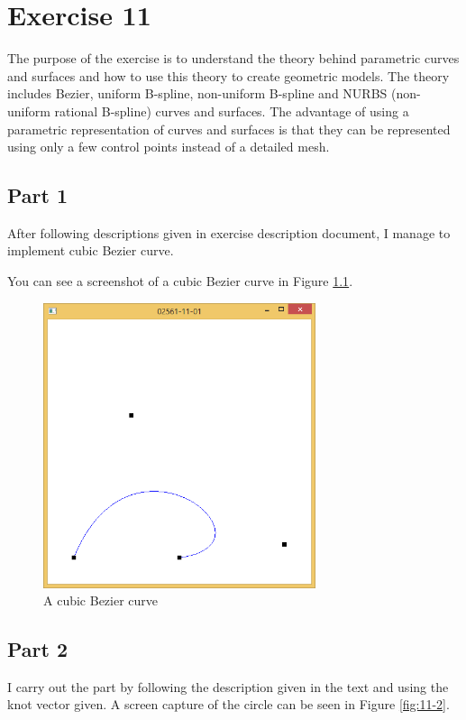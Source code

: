 
\chapter{Exercise 11}
\label{cha:ugeopgave-11}

The purpose of the exercise is to understand the theory behind parametric curves and surfaces and how to use this theory to create geometric models. The theory includes Bezier, uniform B-spline, non-uniform B-spline and NURBS (non-uniform rational B-spline) curves and surfaces.
The advantage of using a parametric representation of curves and surfaces is that they can be represented using only a few control points instead of a detailed mesh.


\section{Part 1}


After following descriptions given in exercise description document, I manage to implement cubic Bezier curve.

You can see a screenshot of a cubic Bezier curve in Figure \ref{fig:11-1}.




\begin{figure}[hp]
\centering
\includegraphics[width=8cm]{../Screenshots/ex-11/1.png}
\caption{A cubic Bezier curve}
\label{fig:11-1}
\end{figure}

\section{Part 2}

I carry out the part by following the description given in the text and using the knot vector given. 
A screen capture of the circle can be seen in Figure \ref{fig:11-2}.

